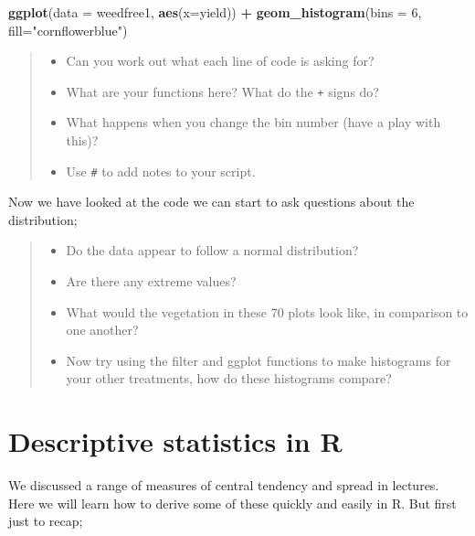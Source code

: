 \documentclass[
]{book}
\newenvironment{Shaded}{\begin{snugshade}}{\end{snugshade}}
\newcommand{\AttributeTok}[1]{\textcolor[rgb]{0.13,0.29,0.53}{#1}}
\newcommand{\DecValTok}[1]{\textcolor[rgb]{0.00,0.00,0.81}{#1}}
\newcommand{\FunctionTok}[1]{\textcolor[rgb]{0.13,0.29,0.53}{\textbf{#1}}}
\newcommand{\NormalTok}[1]{#1}
\newcommand{\SpecialCharTok}[1]{\textcolor[rgb]{0.81,0.36,0.00}{\textbf{#1}}}
\newcommand{\StringTok}[1]{\textcolor[rgb]{0.31,0.60,0.02}{#1}}
\providecommand{\tightlist}{%
  \setlength{\itemsep}{0pt}\setlength{\parskip}{0pt}}
\begin{document}
\begin{Shaded}
\begin{Highlighting}[]
\FunctionTok{ggplot}\NormalTok{(}\AttributeTok{data =}\NormalTok{ weedfree1, }\FunctionTok{aes}\NormalTok{(}\AttributeTok{x=}\NormalTok{yield)) }\SpecialCharTok{+}
  \FunctionTok{geom\_histogram}\NormalTok{(}\AttributeTok{bins =} \DecValTok{6}\NormalTok{, }\AttributeTok{fill=}\StringTok{"cornflowerblue"}\NormalTok{)}
\end{Highlighting}
\end{Shaded}

\begin{quote}
\begin{itemize}
\tightlist
\item
  Can you work out what each line of code is asking for?
\item
  What are your functions here? What do the \texttt{+} signs do?
\item
  What happens when you change the bin number (have a play with this)?
\item
  Use \texttt{\#} to add notes to your script.
\end{itemize}
\end{quote}

Now we have looked at the code we can start to ask questions about the distribution;

\begin{quote}
\begin{itemize}
\tightlist
\item
  Do the data appear to follow a normal distribution?
\item
  Are there any extreme values?
\item
  What would the vegetation in these 70 plots look like, in comparison to one another?
\item
  Now try using the filter and ggplot functions to make histograms for your other treatments, how do these histograms compare?
\end{itemize}
\end{quote}

\hypertarget{descriptive-statistics-in-r}{%
\section{Descriptive statistics in R}\label{descriptive-statistics-in-r}}

We discussed a range of measures of central tendency and spread in lectures. Here we will learn how to derive some of these quickly and easily in R. But first just to recap;
\end{document}
